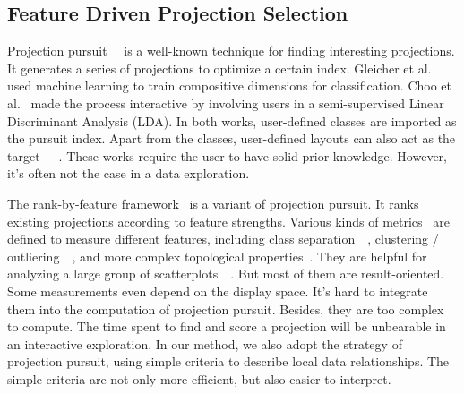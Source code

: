 \subsection{Feature Driven Projection Selection}
Projection pursuit~\cite{DBLP:journals/tc/FriedmanT74}~\cite{cook1995grand} is a well-known technique for finding interesting projections. It generates a series of projections to optimize a certain index. Gleicher et al.~\cite{DBLP:journals/tvcg/Gleicher13} used machine learning to train compositive dimensions for classification. Choo et al.~\cite{DBLP:conf/ieeevast/ChooLKP10} made the process interactive by involving users in a semi-supervised Linear Discriminant Analysis (LDA). In both works, user-defined classes are imported as the pursuit index. Apart from the classes, user-defined layouts can also act as the target~\cite{DBLP:journals/tvcg/JoiaCCPN11}~\cite{DBLP:conf/ieeevast/BrownLBC12}~\cite{DBLP:journals/tvcg/HuBMHNL13}. These works require the user to have solid prior knowledge. However, it's often not the case in a data exploration.

The rank-by-feature framework~\cite{DBLP:journals/ivs/SeoS05} is a variant of projection pursuit. It ranks existing projections according to feature strengths. Various kinds of metrics~\cite{DBLP:conf/ieeevast/AlbuquerqueEM11} are defined to measure different features, including class separation~\cite{DBLP:journals/cgf/SipsNLH09}~\cite{DBLP:journals/cgf/SedlmairTMT12}, clustering / outliering~\cite{DBLP:conf/ieeevast/TatuAESTMK09}~\cite{DBLP:journals/tvcg/JohanssonJ09}, and more complex topological properties~\cite{DBLP:conf/infovis/WilkinsonAG05}. They are helpful for analyzing a large group of scatterplots~\cite{DBLP:conf/apvis/NhonW14}~\cite{DBLP:conf/ieeevast/AnandWN12}. But most of them are result-oriented. Some measurements even depend on the display space. It's hard to integrate them into the computation of projection pursuit. Besides, they are too complex to compute. The time spent to find and score a projection will be unbearable in an interactive exploration. In our method, we also adopt the strategy of projection pursuit, using simple criteria to describe local data relationships. The simple criteria are not only more efficient, but also easier to interpret.

